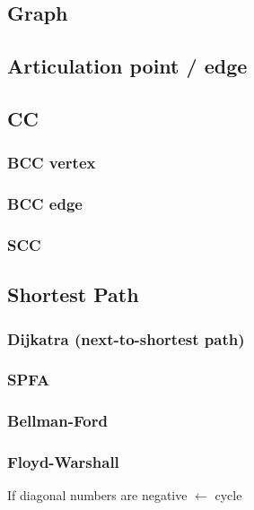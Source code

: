 \documentclass[10pt,oneside]{article}
\begin{document}
\begin{landscape}
\begin{multicols}{2}

\section{Graph}

\subsection{Articulation point / edge}

\subsection{CC}

\subsubsection{BCC vertex}

\subsubsection{BCC edge}

\subsubsection{SCC}

\subsection{Shortest Path}

\subsubsection{Dijkatra (next-to-shortest path)}

\subsubsection{SPFA}

\subsubsection{Bellman-Ford}

\subsubsection{Floyd-Warshall}

If diagonal numbers are negative $\leftarrow$ cycle 


\end{multicols}
\end{landscape}
\end{document}
